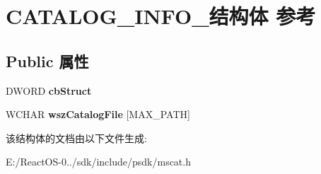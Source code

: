 \hypertarget{struct_c_a_t_a_l_o_g___i_n_f_o__}{}\section{C\+A\+T\+A\+L\+O\+G\+\_\+\+I\+N\+F\+O\+\_\+结构体 参考}
\label{struct_c_a_t_a_l_o_g___i_n_f_o__}
\subsection*{Public 属性}
\begin{DoxyCompactItemize}
\item 
\mbox{\label{struct_c_a_t_a_l_o_g___i_n_f_o___a534c02e4ab76df9e8f75e2c8b3dfc046}} 
D\+W\+O\+RD {\bfseries cb\+Struct}
\item 
\mbox{\label{struct_c_a_t_a_l_o_g___i_n_f_o___a13811671c2a1c6bbf5cdcdc17eafb624}} 
W\+C\+H\+AR {\bfseries wsz\+Catalog\+File} \mbox{[}M\+A\+X\+\_\+\+P\+A\+TH\mbox{]}
\end{DoxyCompactItemize}


该结构体的文档由以下文件生成\+:\begin{DoxyCompactItemize}
\item 
E\+:/\+React\+O\+S-\/0../sdk/include/psdk/mscat.\+h\end{DoxyCompactItemize}
